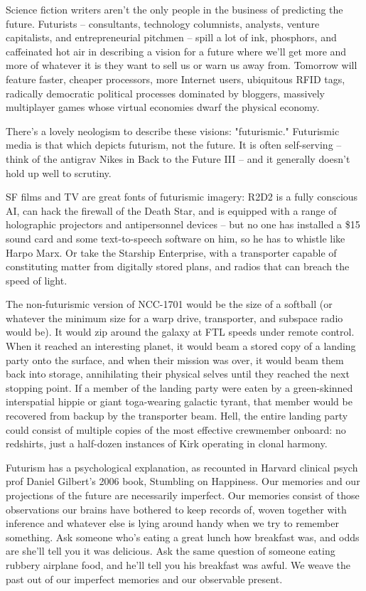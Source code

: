 Science fiction writers aren't the only people in the business of
predicting the future. Futurists -- consultants, technology
columnists, analysts, venture capitalists, and entrepreneurial
pitchmen -- spill a lot of ink, phosphors, and caffeinated hot air
in describing a vision for a future where we'll get more and more
of whatever it is they want to sell us or warn us away from.
Tomorrow will feature faster, cheaper processors, more Internet
users, ubiquitous RFID tags, radically democratic political
processes dominated by bloggers, massively multiplayer games whose
virtual economies dwarf the physical economy.

There's a lovely neologism to describe these visions: "futurismic."
Futurismic media is that which depicts futurism, not the future. It
is often self-serving -- think of the antigrav Nikes in Back to the
Future III -- and it generally doesn't hold up well to scrutiny.

SF films and TV are great fonts of futurismic imagery: R2D2 is a
fully conscious AI, can hack the firewall of the Death Star, and is
equipped with a range of holographic projectors and antipersonnel
devices -- but no one has installed a \$15 sound card and some
text-to-speech software on him, so he has to whistle like Harpo
Marx. Or take the Starship Enterprise, with a transporter capable
of constituting matter from digitally stored plans, and radios that
can breach the speed of light.

The non-futurismic version of NCC-1701 would be the size of a
softball (or whatever the minimum size for a warp drive,
transporter, and subspace radio would be). It would zip around the
galaxy at FTL speeds under remote control. When it reached an
interesting planet, it would beam a stored copy of a landing party
onto the surface, and when their mission was over, it would beam
them back into storage, annihilating their physical selves until
they reached the next stopping point. If a member of the landing
party were eaten by a green-skinned interspatial hippie or giant
toga-wearing galactic tyrant, that member would be recovered from
backup by the transporter beam. Hell, the entire landing party
could consist of multiple copies of the most effective crewmember
onboard: no redshirts, just a half-dozen instances of Kirk
operating in clonal harmony.

Futurism has a psychological explanation, as recounted in Harvard
clinical psych prof Daniel Gilbert's 2006 book, Stumbling on
Happiness. Our memories and our projections of the future are
necessarily imperfect. Our memories consist of those observations
our brains have bothered to keep records of, woven together with
inference and whatever else is lying around handy when we try to
remember something. Ask someone who's eating a great lunch how
breakfast was, and odds are she'll tell you it was delicious. Ask
the same question of someone eating rubbery airplane food, and
he'll tell you his breakfast was awful. We weave the past out of
our imperfect memories and our observable present.


